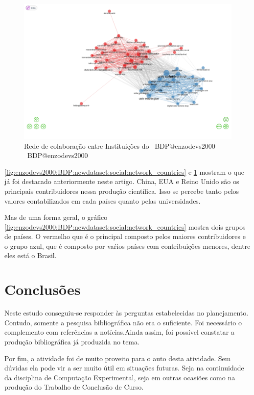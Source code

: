 \begin{figure}[H]
    \centering
    \includegraphics[width=1\textwidth]{experiments/enzodevs2000/AnaliseBibliometrica/BigDataInPolicy/Figures/Graficos/NovoDataset/Social/socialNetworkInstitutions.png}
    \caption{Rede de colaboração entre Instituições do \dataset\ BDP@enzodevs2000
    \dataset\ BDP@enzodevs2000}
    \label{fig:enzodevs2000:BDP:newdataset:social:network_institutions}
\end{figure}

\ref{fig:enzodevs2000:BDP:newdataset:social:network_countries}  e \ref{fig:enzodevs2000:BDP:newdataset:social:network_institutions} mostram o que já foi destacado anteriormente neste artigo. China, EUA e Reino Unido são os principais contribuidores nessa produção científica. Isso se percebe tanto pelos valores contabilizados em cada países quanto pelas universidades.

Mas de uma forma geral, o gráfico \ref{fig:enzodevs2000:BDP:newdataset:social:network_countries} mostra dois grupos de países. O vermelho que é o principal composto pelos maiores contribuidores e o grupo azul, que é composto por vaŕios países com contribuições menores, dentre eles está o Brasil.

\section{Conclusões}

Neste estudo conseguiu-se responder às perguntas estabelecidas no planejamento. Contudo, somente a pesquisa bibliográfica não era o suficiente. Foi necessário o complemento com referências a notícias.Ainda assim, foi possível constatar a produção bibliográfica já produzida no tema.

Por fim, a atividade foi de muito proveito para o auto desta atividade. Sem dúvidas ela pode vir a ser muito útil em situações futuras. Seja na continuidade da disciplina de Computação Experimental, seja em outras ocasiões como na produção do Trabalho de Conclusão de Curso.